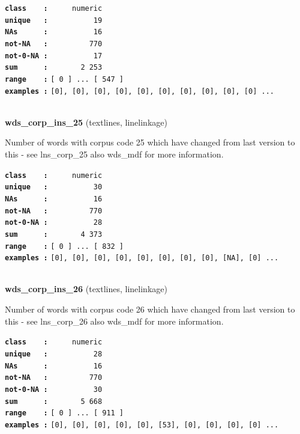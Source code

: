 \documentclass[]{article}
\begin{document}
\textbf{\texttt{class\ \ \ \ :}} \texttt{~~~~~numeric}\\
\textbf{\texttt{unique\ \ \ :}} \texttt{~~~~~~~~~~19}\\
\textbf{\texttt{NAs\ \ \ \ \ \ :}} \texttt{~~~~~~~~~~16}\\
\textbf{\texttt{not-NA\ \ \ :}} \texttt{~~~~~~~~~770}\\
\textbf{\texttt{not-0-NA\ :}} \texttt{~~~~~~~~~~17}\\
\textbf{\texttt{sum\ \ \ \ \ \ :}} \texttt{~~~~~~~2~253}\\
\textbf{\texttt{range\ \ \ \ :}}
\texttt{{[}\ 0\ {]}\ ...\ {[}\ 547\ {]}}\\
\textbf{\texttt{examples\ :}}
\texttt{{[}0{]},\ {[}0{]},\ {[}0{]},\ {[}0{]},\ {[}0{]},\ {[}0{]},\ {[}0{]},\ {[}0{]},\ {[}0{]},\ {[}0{]}\ ...}\\

~

\textbf{wds\_corp\_ins\_25} (textlines, linelinkage)

Number of words with corpus code 25 which have changed from last version
to this - see lns\_corp\_25 also wds\_mdf for more information.

\textbf{\texttt{class\ \ \ \ :}} \texttt{~~~~~numeric}\\
\textbf{\texttt{unique\ \ \ :}} \texttt{~~~~~~~~~~30}\\
\textbf{\texttt{NAs\ \ \ \ \ \ :}} \texttt{~~~~~~~~~~16}\\
\textbf{\texttt{not-NA\ \ \ :}} \texttt{~~~~~~~~~770}\\
\textbf{\texttt{not-0-NA\ :}} \texttt{~~~~~~~~~~28}\\
\textbf{\texttt{sum\ \ \ \ \ \ :}} \texttt{~~~~~~~4~373}\\
\textbf{\texttt{range\ \ \ \ :}}
\texttt{{[}\ 0\ {]}\ ...\ {[}\ 832\ {]}}\\
\textbf{\texttt{examples\ :}}
\texttt{{[}0{]},\ {[}0{]},\ {[}0{]},\ {[}0{]},\ {[}0{]},\ {[}0{]},\ {[}0{]},\ {[}0{]},\ {[}NA{]},\ {[}0{]}\ ...}\\

~

\textbf{wds\_corp\_ins\_26} (textlines, linelinkage)

Number of words with corpus code 26 which have changed from last version
to this - see lns\_corp\_26 also wds\_mdf for more information.

\textbf{\texttt{class\ \ \ \ :}} \texttt{~~~~~numeric}\\
\textbf{\texttt{unique\ \ \ :}} \texttt{~~~~~~~~~~28}\\
\textbf{\texttt{NAs\ \ \ \ \ \ :}} \texttt{~~~~~~~~~~16}\\
\textbf{\texttt{not-NA\ \ \ :}} \texttt{~~~~~~~~~770}\\
\textbf{\texttt{not-0-NA\ :}} \texttt{~~~~~~~~~~30}\\
\textbf{\texttt{sum\ \ \ \ \ \ :}} \texttt{~~~~~~~5~668}\\
\textbf{\texttt{range\ \ \ \ :}}
\texttt{{[}\ 0\ {]}\ ...\ {[}\ 911\ {]}}\\
\textbf{\texttt{examples\ :}}
\texttt{{[}0{]},\ {[}0{]},\ {[}0{]},\ {[}0{]},\ {[}0{]},\ {[}53{]},\ {[}0{]},\ {[}0{]},\ {[}0{]},\ {[}0{]}\ ...}\\
\end{document}
